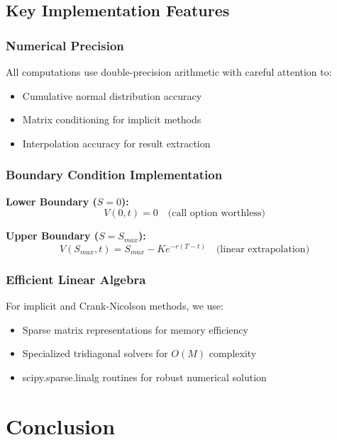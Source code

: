 \documentclass[12pt,a4paper]{article}
\numberwithin{algorithm}{subsection}
\begin{document}
\subsection{Key Implementation Features}

\subsubsection{Numerical Precision}

All computations use double-precision arithmetic with careful attention to:
\begin{itemize}
\item Cumulative normal distribution accuracy
\item Matrix conditioning for implicit methods
\item Interpolation accuracy for result extraction
\end{itemize}

\subsubsection{Boundary Condition Implementation}

\textbf{Lower Boundary ($S = 0$):}
\begin{equation}
V(0,t) = 0 \quad \text{(call option worthless)}
\end{equation}

\textbf{Upper Boundary ($S = S_{max}$):}
\begin{equation}
V(S_{max},t) = S_{max} - K e^{-r(T-t)} \quad \text{(linear extrapolation)}
\end{equation}

\subsubsection{Efficient Linear Algebra}

For implicit and Crank-Nicolson methods, we use:
\begin{itemize}
\item Sparse matrix representations for memory efficiency
\item Specialized tridiagonal solvers for $O(M)$ complexity
\item scipy.sparse.linalg routines for robust numerical solution
\end{itemize}

\section{Conclusion}
\end{document}
